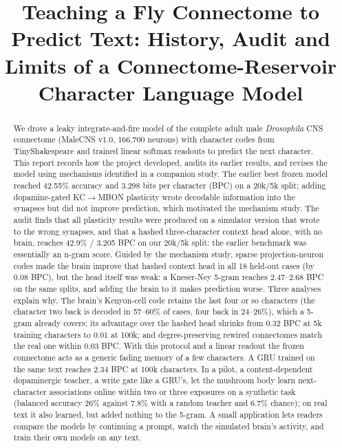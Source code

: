 \documentclass[conference]{IEEEtran}
\begin{document}
\title{Teaching a Fly Connectome to Predict Text: History, Audit and Limits
of a Connectome-Reservoir Character Language Model}

\author{
}

\maketitle

\begin{abstract}
We drove a leaky integrate-and-fire model of the complete adult male
\textit{Drosophila} CNS connectome (MaleCNS v1.0, 166{,}700 neurons) with
character codes from TinyShakespeare and trained linear softmax readouts to
predict the next character. This report records how the project developed,
audits its earlier results, and revises the model using mechanisms identified
in a companion study. The earlier best frozen model reached 42.55\% accuracy
and 3.298 bits per character (BPC) on a 20k/5k split; adding dopamine-gated
KC$\rightarrow$MBON plasticity wrote decodable information into the synapses
but did not improve prediction, which motivated the mechanism study. The audit
finds that all plasticity results were produced on a simulator version that
wrote to the wrong synapses, and that a hashed three-character context head
alone, with no brain, reaches 42.9\% / 3.205 BPC on our 20k/5k split: the
earlier benchmark was essentially an n-gram score. Guided by the mechanism
study, sparse projection-neuron codes made the brain improve that hashed context
head in all 18 held-out cases (by 0.08 BPC), but the head itself was weak: a
Kneser-Ney 5-gram reaches 2.47--2.68 BPC on the same splits, and adding the
brain to it makes prediction worse. Three analyses explain why. The brain's
Kenyon-cell code retains the last four or so characters (the character two
back is decoded in 57--60\% of cases, four back in 24--26\%), which a 5-gram
already covers; its advantage over the hashed head shrinks from 0.32 BPC at 5k
training characters to 0.01 at 100k; and degree-preserving rewired connectomes
match the real one within 0.03 BPC. With this protocol and a linear readout
the frozen connectome acts as a generic fading memory of a few characters. A
GRU trained on the same text reaches 2.34 BPC at 100k characters. In a
pilot, a content-dependent dopaminergic teacher, a write gate like a GRU's,
let the mushroom body learn next-character associations online within two or
three exposures on a synthetic task (balanced accuracy 26\% against 7.8\% with
a random teacher and 6.7\% chance); on real text it also learned, but added
nothing to the 5-gram. A small application lets readers compare the models by
continuing a prompt, watch the simulated brain's activity, and train their own
models on any text.
\end{abstract}
\end{document}
